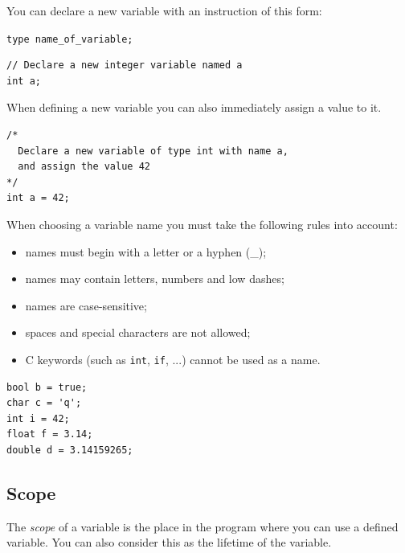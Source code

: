 \documentclass[11pt,fleqn]{book} %
\def\Cpp{{C\nolinebreak[4]\hspace{-.05em}\raisebox{.4ex}{\tiny\bf ++}}}
\begin{document}
\noindent You can declare a new variable with an instruction of this form:

\begin{center}
	\texttt{type name\_of\_variable;}
\end{center}

\begin{example}
	\phantom{ }
	\begin{verbatim}
// Declare a new integer variable named a
int a;
	\end{verbatim}
\end{example}

\noindent When defining a new variable you can also immediately assign a value to it.\\

\begin{example}
	\phantom{ }
	\begin{verbatim}
/*
  Declare a new variable of type int with name a,
  and assign the value 42
*/
int a = 42;
	\end{verbatim}
\end{example}

\noindent  When choosing a variable name you must take the following rules into account:\\

\begin{itemize}
	\item names must begin with a letter or a hyphen (\_);
	\item names may contain letters, numbers and low dashes;
	\item names are case-sensitive;
	\item spaces and special characters are not allowed;
	\item \Cpp{} keywords (such as \texttt{int}, \texttt{if}, ...) cannot be used as a name.
\end{itemize}

\begin{example}
	\phantom{ }
	\begin{verbatim}
bool b = true;
char c = 'q';
int i = 42;
float f = 3.14;
double d = 3.14159265;
	\end{verbatim}
\end{example}

\subsection{Scope}
The \emph{scope} of a variable is the place in the program where you can use a defined variable. You can also consider this as the lifetime of the variable.\\
\end{document}
